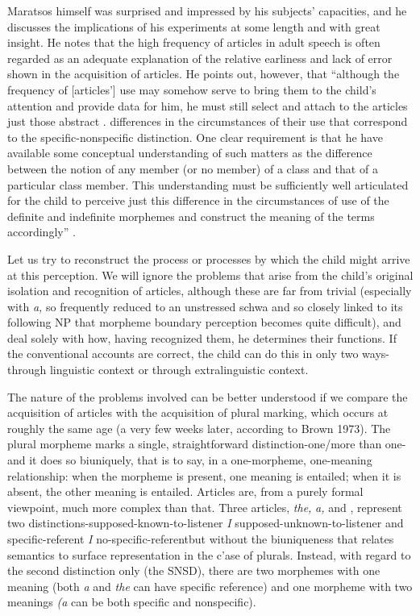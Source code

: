 Maratsos himself was surprised and impressed by his subjects' capacities, and he discusses the implications of his experiments at
some length and with great insight. He notes that the high frequency
of articles in adult speech is often regarded as an adequate explanation
of the relative earliness and lack of error shown in the acquisition of articles. He points out, however, that ``although the frequency of [articles'] use may somehow serve to bring them to the child's atten\-tion and provide data for him, he must still select and attach to the articles just those abstract . differences in the circumstances of their use that correspond to the specific-nonspecific distinction. One clear requirement is that he have available some conceptual understanding of such matters as the difference between the notion of any member (or no member) of a class and that of a particular class member. This understanding must be sufficiently well articulated for the child to perceive just this difference in the circumstances of use of the definite and indefinite morphemes and construct the meaning of the terms accordingly'' \citep[453]{Maratsos1974}.

Let us try to reconstruct the process or processes by which the child might arrive at this perception. We will ignore the problems that arise from the child's original isolation and recognition of articles, although these are far from trivial (especially with \textit{a,} so frequently reduced to an unstressed schwa and so closely linked to its following NP that morpheme boundary perception becomes quite difficult), and deal solely with how, having recognized them, he determines their functions. If the conventional accounts are correct, the child can do this in only two ways-through linguistic context or through extralinguistic context.

The nature of the problems involved can be better understood if we compare the acquisition of articles with the acquisition of plural marking, which occurs at roughly the same age (a very few weeks later, according to Brown 1973). The plural morpheme marks a single, straightforward distinction-one/more than one-and it does so bi\-uniquely, that is to say, in a one-morpheme, one-meaning relationship: when the morpheme is present, one meaning is entailed; when it is absent, the other meaning is entailed. Articles are, from a purely formal viewpoint, much more complex than that. Three articles, \textit{the,} \textit{a,} and
\zero, represent two distinctions-supposed-known-to-listener \textit{I} sup\-posed-unknown-to-listener and specific-referent \textit{I} no-specific-referent\-but without the biuniqueness that relates semantics to surface repre\-sentation in the c'ase of plurals. Instead, with regard to the second distinction only (the SNSD), there are two morphemes with one meaning (both \textit{a} and \textit{the} can have specific reference) and one mor\-pheme with two meanings \textit{(}\textit{a} can be both specific and nonspecific).


